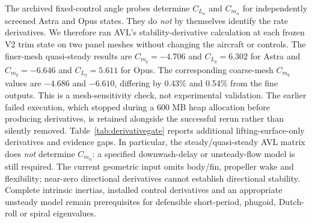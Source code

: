 \documentclass[11pt,a4paper]{article}
\begin{document}
The archived fixed-control angle probes determine $C_{L_\alpha}$ and $C_{m_\alpha}$ for independently screened Astra and Opus states. They do \emph{not} by themselves identify the rate derivatives. We therefore ran AVL's stability-derivative calculation at each frozen V2 trim state on two panel meshes without changing the aircraft or controls. The finer-mesh quasi-steady results are $C_{m_q}=-4.706$ and $C_{L_q}=6.302$ for Astra and $C_{m_q}=-6.646$ and $C_{L_q}=5.611$ for Opus. The corresponding coarse-mesh $C_{m_q}$ values are $-4.686$ and $-6.610$, differing by 0.43\% and 0.54\% from the fine outputs. This is a mesh-sensitivity check, not experimental validation. The earlier failed execution, which stopped during a 600 MB heap allocation before producing derivatives, is retained alongside the successful rerun rather than silently removed. Table~\ref{tab:derivativegate} reports additional lifting-surface-only derivatives and evidence gaps. In particular, the steady/quasi-steady AVL matrix does \emph{not} determine $C_{m_{\dot\alpha}}$: a specified downwash-delay or unsteady-flow model is still required. The current geometric input omits body/fin, propeller wake and flexibility; near-zero directional derivatives cannot establish directional stability. Complete intrinsic inertias, installed control derivatives and an appropriate unsteady model remain prerequisites for defensible short-period, phugoid, Dutch-roll or spiral eigenvalues.
\end{document}

